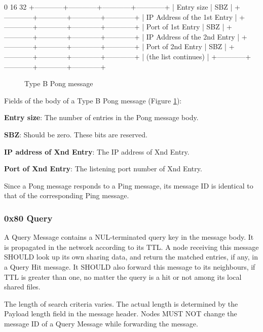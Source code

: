 \documentclass[12pt, a4paper]{article}
\begin{document}
\begin{verbbox}
0                         16                        32
+------------+------------+------------+------------+
|        Entry size       |           SBZ           |
+------------+------------+------------+------------+
|               IP Address of the 1st Entry         |
+------------+------------+------------+------------+
|   Port of 1st Entry     |    	      SBZ           |
+------------+------------+------------+------------+
|               IP Address of the 2nd Entry         |
+------------+------------+------------+------------+
|   Port of 2nd Entry     |    	      SBZ           |
+------------+------------+------------+------------+
|   (the list continues)                            |
+------------+------------+------------+------------+
\end{verbbox}

\begin{figure}[h!]
  \centering
  \theverbbox
  \caption{Type B Pong message}
  \label{bpong}
\end{figure}

Fields of the body of a Type B Pong message (Figure \ref{bpong}):

\textbf{Entry size}: The number of entries in the Pong message body.

\textbf{SBZ}: Should be zero. These bits are reserved.

\textbf{IP address of Xnd Entry}: The IP address of Xnd Entry.

\textbf{Port of Xnd Entry}: The listening port number of Xnd Entry.

\vskip 12pt

Since a Pong message responds to a Ping message, its message ID is identical to that of the corresponding Ping message.


\subsubsection{0x80 Query}
A Query Message contains a NUL-terminated query key in the message body.
It is propagated in the network according to its TTL.
A node receiving this message SHOULD look up its own sharing data, and return the matched entries, if any, in a Query Hit message.
It SHOULD also forward this message to its neighbours, if TTL is greater than one, no matter the query is a hit or not among its local shared files.

The length of search criteria varies. The actual length is determined by the Payload length field in the message header.
Nodes MUST NOT change the message ID of a Query Message while forwarding the message.
\end{document}
